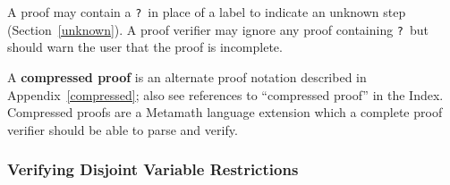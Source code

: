 
A proof may contain a \texttt{?}\ in place of a label to indicate an unknown step
(Section~\ref{unknown}).  A proof verifier may ignore any proof containing
\texttt{?}\ but should warn the user that the proof is incomplete.

A {\bf compressed proof} is an
alternate proof notation described in Appen\-dix~\ref{compressed}; also see
references to ``compressed proof'' in the Index.  Compressed proofs are a
Metamath language extension which a complete proof verifier should be able to
parse and verify.

\subsubsection{Verifying Disjoint Variable Restrictions}

